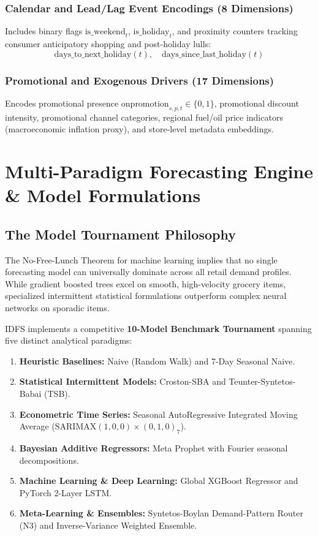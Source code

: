 \documentclass[12pt,a4paper,oneside]{report}
\theoremstyle{definition}
\begin{document}
\subsection{Calendar and Lead/Lag Event Encodings (8 Dimensions)}
Includes binary flags $\text{is\_weekend}_t$, $\text{is\_holiday}_t$, and proximity counters tracking consumer anticipatory shopping and post-holiday lulls:
\begin{equation}
\text{days\_to\_next\_holiday}(t), \quad \text{days\_since\_last\_holiday}(t)
\end{equation}

\subsection{Promotional and Exogenous Drivers (17 Dimensions)}
Encodes promotional presence $\text{onpromotion}_{s,p,t} \in \{0, 1\}$, promotional discount intensity, promotional channel categories, regional fuel/oil price indicators (macroeconomic inflation proxy), and store-level metadata embeddings.

\newpage
\chapter{Multi-Paradigm Forecasting Engine \& Model Formulations}

\section{The Model Tournament Philosophy}
The No-Free-Lunch Theorem for machine learning implies that no single forecasting model can universally dominate across all retail demand profiles. While gradient boosted trees excel on smooth, high-velocity grocery items, specialized intermittent statistical formulations outperform complex neural networks on sporadic items. 

IDFS implements a competitive \textbf{10-Model Benchmark Tournament} spanning five distinct analytical paradigms:
\begin{enumerate}
    \item \textbf{Heuristic Baselines:} Naive (Random Walk) and 7-Day Seasonal Naive.
    \item \textbf{Statistical Intermittent Models:} Croston-SBA and Teunter-Syntetos-Babai (TSB).
    \item \textbf{Econometric Time Series:} Seasonal AutoRegressive Integrated Moving Average ($\text{SARIMAX}(1,0,0)\times(0,1,0)_7$).
    \item \textbf{Bayesian Additive Regressors:} Meta Prophet with Fourier seasonal decompositions.
    \item \textbf{Machine Learning \& Deep Learning:} Global XGBoost Regressor and PyTorch 2-Layer LSTM.
    \item \textbf{Meta-Learning \& Ensembles:} Syntetos-Boylan Demand-Pattern Router (N3) and Inverse-Variance Weighted Ensemble.
\end{enumerate}
\end{document}

